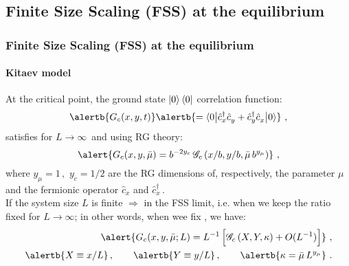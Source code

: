 \subsection[FSS]{Finite Size Scaling (FSS) at the equilibrium}

\begin{frame}
\frametitle{Finite Size Scaling (FSS) at the equilibrium}
\framesubtitle{Kitaev model}
\small
At the critical point, the \alert{ground state} $\ket{0}\bra{0}$ correlation function:
\begin{equation}
\label{correlations}
\alertb{
G_c(x,y,t)}  \alertb{ =  
\braket{0 \big| \hat c_{x}^\dagger \hat
  c_{y}^{\phantom\dagger} + \hat c_{y}^\dagger \hat
  c_{x}^{\phantom\dagger} \big| 0}}\,\,,%
\end{equation}
satisfies for $L\to \infty\,$ and using RG theory:
\begin{equation}
\alert{
G_{c}(x,y,\bar \mu)= b^{-2y_c} \,\mathscr{G}_{c} \left( x/b, y/b, \bar \mu \,b^{y_\mu}\right)} \,\,,
\end{equation}
where $y_\mu=1\,,\,\,y_c=1/2$ are the RG dimensions of, respectively, the parameter $\mu$ and the fermionic operator $\hat c_x$ and $\hat c_x^\dagger\,$.\\
$ $\\
$ $\\
$ $\\
If the system size $L$ is finite \alert{$\Longrightarrow$} in the FSS limit, i.e. when we keep the ratio  fixed for $L \to \infty$; in other words, when wee fix , we have:
\begin{eqnarray}  
\label{scalKitaev}
\alert{
G_{c}(x,y,\bar \mu; L)= L^{-1} \,\Bigr[\mathscr{G}_{c} \left( X, Y, \kappa\right) + O(L^{-1}) \Bigr]} \,\,,\\
\alertb{X \equiv x/L}\,, \qquad \alertb{Y \equiv y/L}\,, \qquad \alertb{\kappa = \bar \mu \,L^{y_\mu} }\,\,.
\end{eqnarray}

\end{frame}
